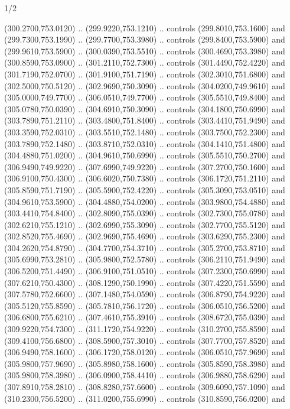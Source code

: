 \begin{flagdescription}{1/2}
\begin{scope}[xshift=0.5\flaglength]
\begin{scope}[scale=0.00745\flagwidth,xshift=-12.1mm,yshift=41.7mm]
\begin{scope}[y=0.80pt, x=0.80pt, yscale=-1, xscale=1, inner sep=0pt, outer sep=0pt]
\begin{scope}[cm={{1.33333,0.0,0.0,-1.33333,(0.0,114.66667)}}]
\begin{scope}[scale=0.100]
  (300.2700,753.0120) .. (299.9220,753.1210) .. controls (299.8010,753.1600) and
  (299.7300,753.1990) .. (299.7700,753.3980) .. controls (299.8400,753.5900) and
  (299.9610,753.5900) .. (300.0390,753.5510) .. controls (300.4690,753.3980) and
  (300.8590,753.0900) .. (301.2110,752.7300) .. controls (301.4490,752.4220) and
  (301.7190,752.0700) .. (301.9100,751.7190) .. controls (302.3010,751.6800) and
  (302.5000,750.5120) .. (302.9690,750.3090) .. controls (304.0200,749.9610) and
  (305.0000,749.7700) .. (306.0510,749.7700) .. controls (305.5510,749.8400) and
  (305.0780,750.0390) .. (304.6910,750.3090) .. controls (304.1800,750.6990) and
  (303.7890,751.2110) .. (303.4800,751.8400) .. controls (303.4410,751.9490) and
  (303.3590,752.0310) .. (303.5510,752.1480) .. controls (303.7500,752.2300) and
  (303.7890,752.1480) .. (303.8710,752.0310) .. controls (304.1410,751.4800) and
  (304.4880,751.0200) .. (304.9610,750.6990) .. controls (305.5510,750.2700) and
  (306.9490,749.9220) .. (307.6990,749.9220) .. controls (307.2700,750.1600) and
  (306.9100,750.4300) .. (306.6020,750.7380) .. controls (306.1720,751.2110) and
  (305.8590,751.7190) .. (305.5900,752.4220) .. controls (305.3090,753.0510) and
  (304.9610,753.5900) .. (304.4880,754.0200) .. controls (303.9800,754.4880) and
  (303.4410,754.8400) .. (302.8090,755.0390) .. controls (302.7300,755.0780) and
  (302.6210,755.1210) .. (302.6990,755.3090) .. controls (302.7700,755.5120) and
  (302.8520,755.4690) .. (302.9690,755.4690) .. controls (303.6290,755.2300) and
  (304.2620,754.8790) .. (304.7700,754.3710) .. controls (305.2700,753.8710) and
  (305.6990,753.2810) .. (305.9800,752.5780) .. controls (306.2110,751.9490) and
  (306.5200,751.4490) .. (306.9100,751.0510) .. controls (307.2300,750.6990) and
  (307.6210,750.4300) .. (308.1290,750.1990) .. controls (307.4220,751.5590) and
  (307.5780,752.6600) .. (307.1480,754.0590) .. controls (306.8790,754.9220) and
  (305.5120,755.8590) .. (305.7810,756.1720) .. controls (306.0510,756.5200) and
  (306.6800,755.6210) .. (307.4610,755.3910) .. controls (308.6720,755.0390) and
  (309.9220,754.7300) .. (311.1720,754.9220) .. controls (310.2700,755.8590) and
  (309.4100,756.6800) .. (308.5900,757.3010) .. controls (307.7700,757.8520) and
  (306.9490,758.1600) .. (306.1720,758.0120) .. controls (306.0510,757.9690) and
  (305.9800,757.9690) .. (305.8980,758.1600) .. controls (305.8590,758.3980) and
  (305.9800,758.3980) .. (306.0900,758.4410) .. controls (306.9880,758.6290) and
  (307.8910,758.2810) .. (308.8280,757.6600) .. controls (309.6090,757.1090) and
  (310.2300,756.5200) .. (311.0200,755.6990) .. controls (310.8590,756.0200) and

\end{scope}
\end{scope}
\end{scope}
\end{scope}
\end{scope}
\end{flagdescription}
